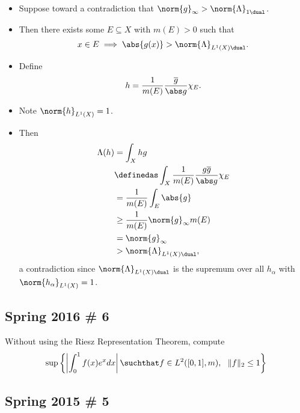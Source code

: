 \begin{solution}
\begin{itemize}
\begin{itemize}
    \begin{itemize}
    \item
      Suppose toward a contradiction that
      \(\norm{g}_\infty > \norm{\Lambda}_{1\dual}\).
    \item
      Then there exists some \(E\subseteq X\) with \(m(E) > 0\) such
      that
      \begin{align*}x\in E \implies \abs{g(x)} > \norm{\Lambda}_{L^1(X)\dual}.\end{align*}
    \item
      Define
      \begin{align*}
      h = \frac{1}{m(E)} \frac{\overline{g}}{\abs g} \chi_E
      .\end{align*}
    \item
      Note \(\norm{h}_{L^1(X)} = 1\).
    \item
      Then
      \begin{align*}
      \Lambda(h) &= \int_X hg \\
      &\definedas \int_X \frac{1}{m(E)} \frac{g \overline g}{\abs g} \chi_E \\
      &= \frac{1}{m(E)} \int_E \abs{g} \\
      &\geq \frac{1}{m(E)} \norm{g}_\infty m(E) \\
      &= \norm{g}_\infty \\
      &> \norm{\Lambda}_{L^1(X)\dual}
      ,\end{align*} a contradiction since
      \(\norm{\Lambda}_{L^1(X)\dual}\) is the supremum over all
      \(h_\alpha\) with \(\norm{h_\alpha}_{L^1(X)} = 1\).
    \end{itemize}
  \end{itemize}
\end{itemize}

\end{solution}

\hypertarget{spring-2016-6}{%
\subsection{Spring 2016 \# 6}\label{spring-2016-6}}

Without using the Riesz Representation Theorem, compute
\begin{align*}
\sup \left\{\left|\int_{0}^{1} f(x) e^{x} d x\right| \suchthat f \in L^{2}([0,1], m),~~ \|f\|_{2} \leq 1\right\}
\end{align*}

\hypertarget{spring-2015-5}{%
\subsection{Spring 2015 \# 5}\label{spring-2015-5}}

